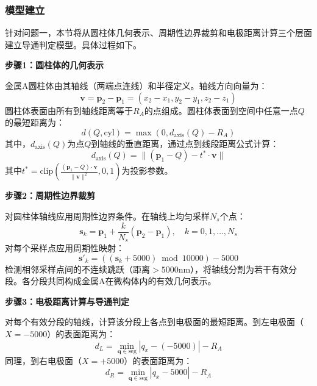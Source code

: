 
\subsubsection{模型建立}

针对问题一，本节将从圆柱体几何表示、周期性边界裁剪和电极距离计算三个层面建立导通判定模型。具体过程如下。

\textbf{步骤1：圆柱体的几何表示}

金属A圆柱体由其轴线（两端点连线）和半径定义。轴线方向向量为：
\begin{equation}
\mathbf{v} = \mathbf{p}_2 - \mathbf{p}_1 = (x_2-x_1, y_2-y_1, z_2-z_1)
\end{equation}
圆柱体表面由所有到轴线距离等于$R_A$的点组成。圆柱体表面到空间中任意一点$Q$的最短距离为：
\begin{equation}
d(Q, \text{cyl}) = \max(0, d_{\text{axis}}(Q) - R_A)
\end{equation}
其中，$d_{\text{axis}}(Q)$为点$Q$到轴线的垂直距离，通过点到线段距离公式计算：
\begin{equation}
d_{\text{axis}}(Q) = \|(\mathbf{p}_1 - Q) - t^* \cdot \mathbf{v}\|
\end{equation}
其中$t^* = \text{clip}\left(\frac{(\mathbf{p}_1 - Q) \cdot \mathbf{v}}{\|\mathbf{v}\|^2}, 0, 1\right)$为投影参数。

\textbf{步骤2：周期性边界裁剪}

对圆柱体轴线应用周期性边界条件。在轴线上均匀采样$N_s$个点：
\begin{equation}
\mathbf{s}_k = \mathbf{p}_1 + \frac{k}{N_s}(\mathbf{p}_2 - \mathbf{p}_1), \quad k = 0, 1, \ldots, N_s
\end{equation}
对每个采样点应用周期性映射：
\begin{equation}
\mathbf{s}'_k = ((\mathbf{s}_k + 5000) \bmod 10000) - 5000
\end{equation}
检测相邻采样点间的不连续跳跃（距离$>5000$nm），将轴线分割为若干有效分段。各分段共同构成金属A在微构体内的有效几何表示。

\textbf{步骤3：电极距离计算与导通判定}

对每个有效分段的轴线，计算该分段上各点到电极面的最短距离。到左电极面（$X=-5000$）的表面距离为：
\begin{equation}
d_L = \min_{\mathbf{q} \in \text{seg}} |q_x - (-5000)| - R_A
\end{equation}
同理，到右电极面（$X=+5000$）的表面距离为：
\begin{equation}
d_R = \min_{\mathbf{q} \in \text{seg}} |q_x - 5000| - R_A
\end{equation}

